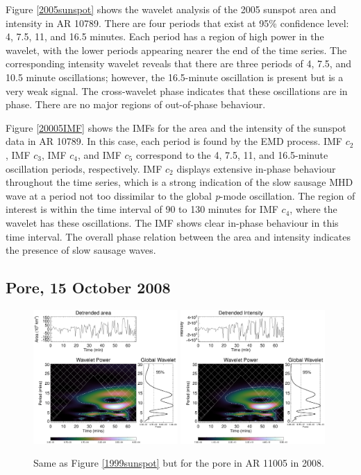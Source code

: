 	Figure \ref{2005sunspot} shows the wavelet analysis of the 2005 sunspot area and intensity in AR 10789.
	There are four periods that exist at 95\% confidence level: 4, 7.5, 11, and 16.5 minutes.
	Each period has a region of high power in the wavelet, with the lower periods appearing nearer the end of the time series.
	The corresponding intensity wavelet reveals that there are three periods of 4, 7.5, and 10.5 minute oscillations; however, the 16.5-minute oscillation is present but is a very weak signal.
	The cross-wavelet phase indicates that these oscillations are in phase.
	There are no major regions of out-of-phase behaviour.
		
	Figure \ref{20005IMF} shows the IMFs for the area and the intensity of the sunspot data in AR 10789.
	In this case, each period is found by the EMD process. IMF $c_{2}$, IMF $c_{3}$, IMF $c_{4}$, and IMF $c_{5}$ correspond to the 4, 7.5, 11, and 16.5-minute oscillation periods, respectively.
	IMF $c_{2}$ displays extensive in-phase behaviour throughout the time series, which is a strong indication of the slow sausage MHD wave at a period not too dissimilar to the global \textit{p}-mode oscillation.
	The region of interest is within the time interval of 90 to 130 minutes for IMF $c_{4}$, where the wavelet has these oscillations.
	The IMF shows clear in-phase behaviour in this time interval.
	The overall phase relation between the area and intensity indicates the presence of slow sausage waves.
	
\subsection{Pore, 15 October 2008}

   \begin{figure}
   \centering
   \includegraphics[width=0.49\textwidth]{2008_wl.eps}
   \includegraphics[width=0.49\textwidth]{2008_wl_inten.eps}
   	   \caption{
      			Same as Figure \ref{1999sunspot} but for the pore in AR 11005 in 2008.
 		      }
      \label{2008pore}
   \end{figure}
   

